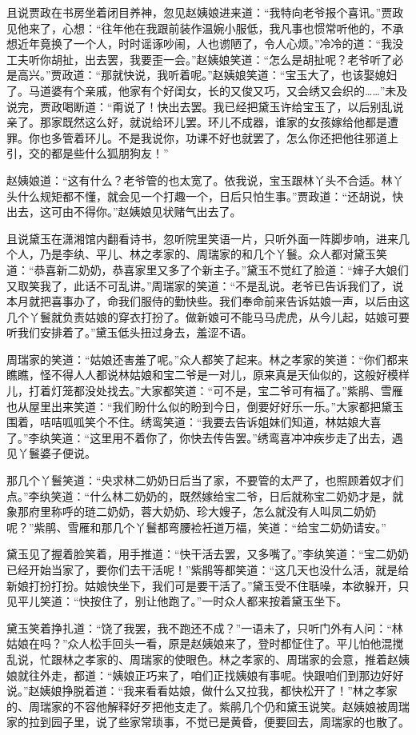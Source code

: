\documentclass[12pt,oneside]{book}
\begin{document}
且说贾政在书房坐着闭目养神，忽见赵姨娘进来道：“我特向老爷报个喜讯。”贾政见他来了，心想：“往年他在我跟前装作温婉小服低，我凡事也惯常听他的，不承想近年竟换了一个人，时时谣诼吵闹，人也谫陋了，令人心烦。”冷冷的道：“我没工夫听你胡扯，出去罢，我要歪一会。”赵姨娘笑道：“怎么是胡扯呢？老爷听了必是高兴。”贾政道：“那就快说，我听着呢。”赵姨娘笑道：“宝玉大了，也该娶媳妇了。马道婆有个亲戚，他家有个好闺女，长的又俊又巧，又会绣又会织的……”未及说完，贾政喝断道：“甭说了！快出去罢。我已经把黛玉许给宝玉了，以后别乱说亲了。那家既然这么好，就说给环儿罢。环儿不成器，谁家的女孩嫁给他都是遭罪。你也多管着环儿。不是我说你，功课不好也就罢了，怎么你还把他往邪道上引，交的都是些什么狐朋狗友！”

赵姨娘道：“这有什么？老爷管的也太宽了。依我说，宝玉跟林丫头不合适。林丫头什么规矩都不懂，就会见一个打趣一个，日后只怕生事。”贾政道：“还胡说，快出去，这可由不得你。”赵姨娘见状赌气出去了。

且说黛玉在潇湘馆内翻看诗书，忽听院里笑语一片，只听外面一阵脚步响，进来几个人，乃是李纨、平儿、林之孝家的、周瑞家的和几个丫鬟。众人都对黛玉笑道：“恭喜新二奶奶，恭喜家里又多了个新主子。”黛玉不觉红了脸道：“婶子大娘们又取笑我了，此话不可乱讲。”周瑞家的笑道：“不是乱说。老爷已告诉我们了，说本月就把喜事办了，命我们服侍的勤快些。我们奉命前来告诉姑娘一声，以后由这几个丫鬟就负责姑娘的穿衣打扮了。做新娘可不能马马虎虎，从今儿起，姑娘可要听我们安排着了。”黛玉低头扭过身去，羞涩不语。

周瑞家的笑道：“姑娘还害羞了呢。”众人都笑了起来。林之孝家的笑道：“你们都来瞧瞧，怪不得人人都说林姑娘和宝二爷是一对儿，原来真是天仙似的，这般好模样儿，打着灯笼都没处找去。”大家都笑道：“可不是，宝二爷可有福了。”紫鹃、雪雁也从屋里出来笑道：“我们盼什么似的盼到今日，倒要好好乐一乐。”大家都把黛玉围着，咭咭呱呱笑个不住。绣鸾笑道：“我要去告诉姐妹们知道，林姑娘大喜了。”李纨笑道：“这里用不着你了，你快去传告罢。”绣鸾喜冲冲疾步走了出去，遇见丫鬟婆子便说。

那几个丫鬟笑道：“央求林二奶奶日后当了家，不要管的太严了，也照顾着奴才们点。”李纨笑道：“什么林二奶奶的，既然嫁给宝二爷，日后就称宝二奶奶才是，就象那府里称呼的琏二奶奶，蓉大奶奶、珍大嫂子，怎么就没有人叫凤二奶奶呢？”紫鹃、雪雁和那几个丫鬟都弯腰裣衽道万福，笑道：“给宝二奶奶请安。”

黛玉见了握着脸笑着，用手推道：“快干活去罢，又多嘴了。”李纨笑道：“宝二奶奶已经开始当家了，要你们去干活呢！”紫鹃等都笑道：“这几天也没什么活，就是给新娘打扮打扮。姑娘快坐下，我们可是要干活了。”黛玉受不住聒噪，本欲躲开，只见平儿笑道：“快按住了，别让他跑了。”一时众人都来按着黛玉坐下。

黛玉笑着挣扎道：“饶了我罢，我不跑还不成？”一语未了，只听门外有人问：“林姑娘在吗？”众人松手回头一看，原是赵姨娘来了，登时都怔住了。平儿怕他混搅乱说，忙跟林之孝家的、周瑞家的使眼色。林之孝家的、周瑞家的会意，推着赵姨娘就往外走，都道：“姨娘正巧来了，咱们正找姨娘有事呢。快跟咱们到那边好好说。”赵姨娘挣脱着道：“我来看看姑娘，做什么又拉我，都快松开了！”林之孝家的、周瑞家的不容他解释好歹把他支走了。紫鹃几个仍和黛玉说笑。赵姨娘被周瑞家的拉到园子里，说了些家常琐事，不觉已是黄昏，便要回去，周瑞家的也散了。
\end{document}
